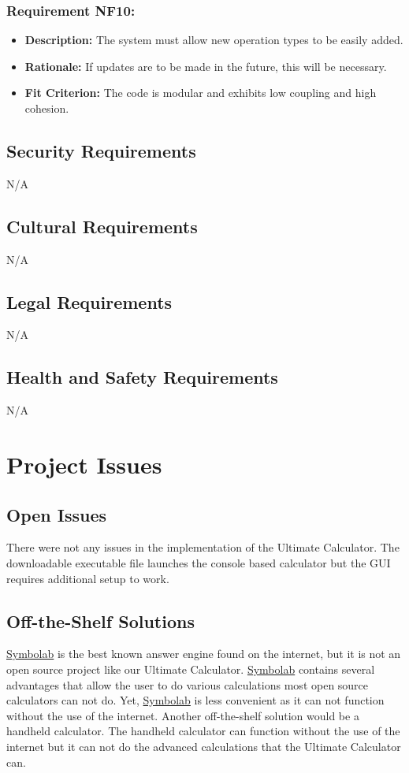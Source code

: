 \documentclass[12pt, titlepage]{article}
\begin{document}
\subsubsection*{Requirement NF10:}
\begin{itemize}
  \item \textbf{Description:} The system must allow new operation types to be easily added.
  \item \textbf{Rationale:} If updates are to be made in the future, this will be necessary.
  \item \textbf{Fit Criterion:} The code is modular and exhibits low coupling and high cohesion.
\end{itemize}

\subsection{Security Requirements}
N/A

\subsection{Cultural Requirements}
N/A
\subsection{Legal Requirements}
N/A
\subsection{Health and Safety Requirements}
N/A

\section{Project Issues}

\subsection{Open Issues}
There were not any issues in the implementation of the Ultimate Calculator. The downloadable executable file launches the console based calculator but the GUI requires additional setup to work.
\subsection{Off-the-Shelf Solutions}
\href{https://www.symbolab.com/}{Symbolab} is the best known answer engine found on the internet, but it is not an open source project like our Ultimate Calculator. \href{https://www.symbolab.com/}{Symbolab} contains several advantages that allow the user to do various calculations most open source calculators can not do. Yet, \href{https://www.symbolab.com/}{Symbolab} is less convenient as it can not function without the use of the internet. Another off-the-shelf solution would be a handheld calculator. The handheld calculator can function without the use of the internet but it can not do the advanced calculations that the Ultimate Calculator can.
\end{document}
